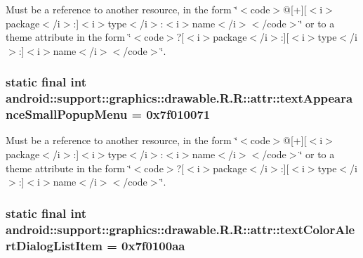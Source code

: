 Must be a reference to another resource, in the form \char`\"{}$<$code$>$@\mbox{[}+\mbox{]}\mbox{[}$<$i$>$package$<$/i$>$:\mbox{]}$<$i$>$type$<$/i$>$:$<$i$>$name$<$/i$>$$<$/code$>$\char`\"{} or to a theme attribute in the form \char`\"{}$<$code$>$?\mbox{[}$<$i$>$package$<$/i$>$:\mbox{]}\mbox{[}$<$i$>$type$<$/i$>$:\mbox{]}$<$i$>$name$<$/i$>$$<$/code$>$\char`\"{}. \hypertarget{classandroid_1_1support_1_1graphics_1_1drawable_1_1_r_1_1attr_20c0c7f79c16be662b8956b2ad2e9c3d}{
\subsubsection[{textAppearanceSmallPopupMenu}]{\setlength{\rightskip}{0pt plus 5cm}static final int android::support::graphics::drawable.R.R::attr::textAppearanceSmallPopupMenu = 0x7f010071}}
\label{classandroid_1_1support_1_1graphics_1_1drawable_1_1_r_1_1attr_20c0c7f79c16be662b8956b2ad2e9c3d}


Must be a reference to another resource, in the form \char`\"{}$<$code$>$@\mbox{[}+\mbox{]}\mbox{[}$<$i$>$package$<$/i$>$:\mbox{]}$<$i$>$type$<$/i$>$:$<$i$>$name$<$/i$>$$<$/code$>$\char`\"{} or to a theme attribute in the form \char`\"{}$<$code$>$?\mbox{[}$<$i$>$package$<$/i$>$:\mbox{]}\mbox{[}$<$i$>$type$<$/i$>$:\mbox{]}$<$i$>$name$<$/i$>$$<$/code$>$\char`\"{}. \hypertarget{classandroid_1_1support_1_1graphics_1_1drawable_1_1_r_1_1attr_730eac905545ddfa05134b8d71ebbd11}{
\subsubsection[{textColorAlertDialogListItem}]{\setlength{\rightskip}{0pt plus 5cm}static final int android::support::graphics::drawable.R.R::attr::textColorAlertDialogListItem = 0x7f0100aa}}
\label{classandroid_1_1support_1_1graphics_1_1drawable_1_1_r_1_1attr_730eac905545ddfa05134b8d71ebbd11}


